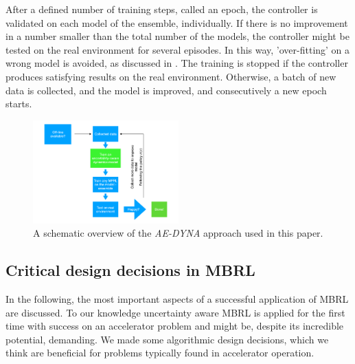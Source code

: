 \documentclass[
reprint,
amsmath,amssymb,amsfonts,clevref,
aps,
prstab,
]{revtex4-2}
\begin{document}
	After a defined number of training steps, called an epoch, the controller is validated on each model of the ensemble, individually. If there is no improvement in a number smaller than the total number of the models, the controller might be tested on the real environment for several episodes. In this way, 'over-fitting' on a wrong model is avoided, as discussed in \cite{Kurutach2018}. The training is stopped if the controller produces satisfying results on the real environment. Otherwise, a batch of new data is collected, and the model is improved, and consecutively a new epoch starts.
	\begin{figure}[!h]
		\centering
		\includegraphics*[width=0.5\textwidth]{Figures/MBRL_overview}
		\caption{A schematic overview of the \emph{AE-DYNA} approach used in this paper.}
		\label{fig:MBRL_overview}
	\end{figure}
	\subsection{Critical design decisions in MBRL}\label{ss:critical_design}
	In the following, the most important aspects of a successful application of MBRL are discussed. To our knowledge uncertainty aware MBRL is applied for the first time with success on an accelerator problem and might be, despite its incredible potential, demanding. We made some algorithmic design decisions, which we think are beneficial for problems typically found in accelerator operation.\\
\end{document}
